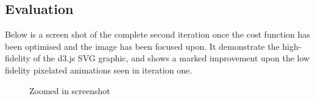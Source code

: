 \documentclass[a4paper,11pt,titlepage]{article}
\begin{document}
	\begin{figure}[H]
    			\centering	
    			\qquad
    			\caption{ }%
    			\label{fig:iter2}
	\end{figure}	


	\subsection{Evaluation}
	Below is a screen shot of the complete second iteration once the cost function has been optimised and the image has been focused upon. It demonstrate the high-fidelity of the d3.js SVG graphic, and shows a marked improvement upon the low fidelity pixelated animations seen in iteration one.

	\begin{figure}[H]
    			\caption{Zoomed in screenshot}%
	\end{figure}
		
\end{document}
